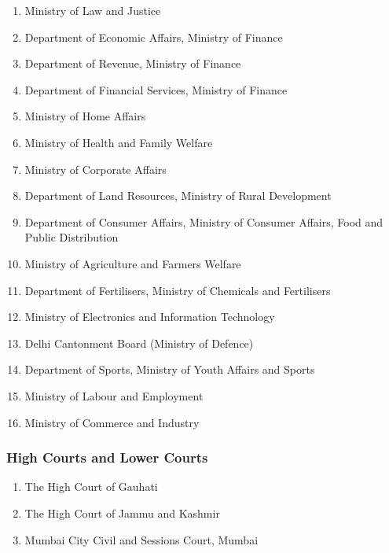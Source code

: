 \documentclass[a4paper,11pt]{article}
\begin{document}
        \begin{enumerate}
            \item Ministry of Law and Justice 
            \item Department of Economic Affairs, Ministry of Finance
            \item Department of Revenue, Ministry of Finance 
            \item Department of Financial Services, Ministry of Finance
            \item Ministry of Home Affairs
            \item Ministry of Health and Family Welfare 
            \item Ministry of Corporate Affairs
            \item Department of Land Resources, Ministry of Rural Development
            \item Department of Consumer Affairs, Ministry of Consumer Affairs, Food and Public Distribution
            \item Ministry of Agriculture and Farmers Welfare
            \item Department of Fertilisers, Ministry of Chemicals and Fertilisers
            \item Ministry of Electronics and Information Technology
            \item Delhi Cantonment Board (Ministry of Defence)
            \item Department of Sports, Ministry of Youth Affairs and Sports
            \item Ministry of Labour and Employment
            \item Ministry of Commerce and Industry

        \end{enumerate}
        
        \subsubsection{High Courts and Lower Courts}
        
        \begin{enumerate}
            \item The High Court of Gauhati
            \item The High Court of Jammu and Kashmir
            \item Mumbai City Civil and Sessions Court, Mumbai

        \end{enumerate}
        
\end{document}
